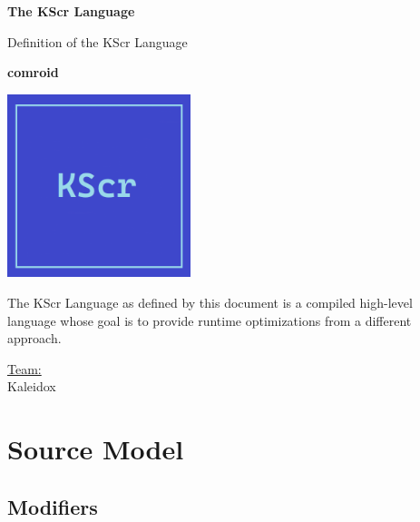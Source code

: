 \documentclass{docs}
\begin{document}
    \begin{titlepage}
        \begin{center}
            \vspace*{1cm}
            
            \Huge
            \textbf{The KScr Language}
            
            \vspace{0.5cm}
            \LARGE
            Definition of the KScr Language
            
            \vspace{1.5cm}
            
            \textbf{comroid}
            
            \vspace{0.8cm}
            
            \includegraphics[width=0.4\textwidth]{img/kscr-icon.png}
            
            \vfill
            
            The KScr Language as defined by this document is a compiled high-level language whose goal is to provide runtime optimizations from a different approach.
            
            \vspace{1.2cm}
            
            \Large
            \underline{Team:} \\
            Kaleidox
        \end{center}
    \end{titlepage}
    \tableofcontents
    \pagebreak
    \section{Source Model}
    \subsection{Modifiers}
\end{document}
